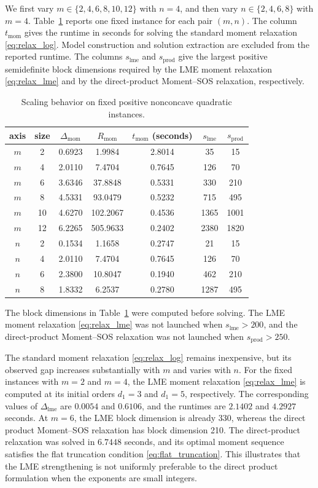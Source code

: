\documentclass[pdflatex,sn-mathphys-num]{sn-jnl}%
\theoremstyle{thmstyleone}%
\theoremstyle{thmstyletwo}%
\theoremstyle{thmstylethree}%
\begin{document}
{We first vary $m\in\{2,4,6,8,10,12\}$ with $n=4$, and then vary
$n\in\{2,4,6,8\}$ with $m=4$. Table~\ref{tab:scaling} reports one
fixed instance for each pair $(m,n)$. The column $t_{\mathrm{mom}}$
gives the runtime in seconds for solving the standard moment relaxation
\eqref{eq:relax_log}. Model construction and solution extraction are
excluded from the reported runtime.
The columns $s_{\mathrm{lme}}$ and $s_{\mathrm{prod}}$ give the largest
positive semidefinite block dimensions required by the LME moment
relaxation \eqref{eq:relax_lme} and by the direct-product Moment--SOS
relaxation, respectively.

\begin{table}[htb]
\centering
\caption{Scaling behavior on fixed positive nonconcave quadratic
instances.}
\label{tab:scaling}
\begin{tabular}{|c|c|c|c|c|c|c|}
\hline
axis & size & $\Delta_{\mathrm{mom}}$
& $R_{\mathrm{mom}}$
& $t_{\mathrm{mom}}$ (seconds)& $s_{\mathrm{lme}}$ & $s_{\mathrm{prod}}$\\
\hline
$m$ & 2  & 0.6923 & 1.9984   & 2.8014 & 35   & 15\\
$m$ & 4  & 2.0110 & 7.4704   & 0.7645 & 126  & 70\\
$m$ & 6  & 3.6346 & 37.8848  & 0.5331 & 330 & 210\\
$m$ & 8  & 4.5331 & 93.0479  & 0.5232 & 715 & 495\\
$m$ & 10 & 4.6270 & 102.2067 & 0.4536 & 1365 & 1001\\
$m$ & 12 & 6.2265 & 505.9633 & 0.2402 & 2380 & 1820\\
\hline
$n$ & 2 & 0.1534 & 1.1658  & 0.2747 & 21   & 15\\
$n$ & 4 & 2.0110 & 7.4704  & 0.7645 & 126  & 70\\
$n$ & 6 & 2.3800 & 10.8047 & 0.1940 & 462 & 210\\
$n$ & 8 & 1.8332 & 6.2537  & 0.2780 & 1287 & 495\\
\hline
\end{tabular}
\end{table}

The block dimensions in Table~\ref{tab:scaling} were computed
before solving. The LME moment relaxation \eqref{eq:relax_lme} was not
launched when $s_{\mathrm{lme}}>200$, and the direct-product
Moment--SOS relaxation was not launched when
$s_{\mathrm{prod}}>250$.

The standard moment relaxation \eqref{eq:relax_log} remains inexpensive,
but its observed gap
increases substantially with $m$ and varies with $n$.
For the fixed instances with $m=2$ and $m=4$, the LME moment
relaxation \eqref{eq:relax_lme} is computed at its initial orders
$d_1=3$ and $d_1=5$, respectively.
The corresponding values of $\Delta_{\mathrm{lme}}$ are $0.0054$ and
$0.6106$, and the runtimes are $2.1402$ and $4.2927$ seconds.
At $m=6$, the LME block dimension is already 330, whereas the direct
product Moment--SOS relaxation has block dimension 210.
The direct-product relaxation was solved in $6.7448$ seconds, and
its optimal moment sequence satisfies the flat truncation condition
\eqref{eq:flat_truncation}. This illustrates that
the LME strengthening is not
uniformly preferable to the direct product formulation when the
exponents are small integers.

}
\end{document}
